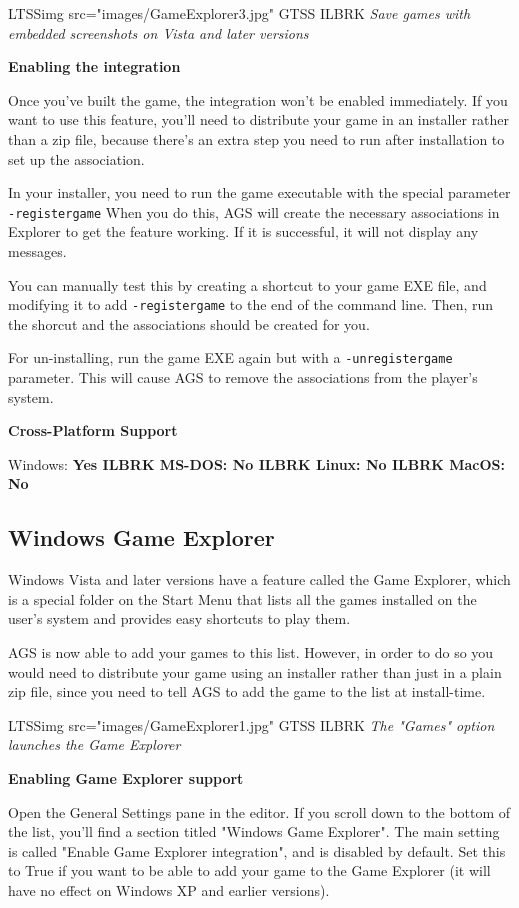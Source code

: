 LTSSimg src="images/GameExplorer3.jpg" GTSS ILBRK
\it{Save games with embedded screenshots on Vista and later versions}

\bf{Enabling the integration}

Once you've built the game, the integration won't be enabled immediately. If you want to
use this feature, you'll need to distribute your game in an installer rather than a zip
file, because there's an extra step you need to run after installation to set up the
association.

In your installer, you need to run the game executable with the special
parameter \verb$-registergame$  When you do this, AGS will create the necessary
associations in Explorer to get the feature working. If it is successful, it will
not display any messages.

You can manually test this by creating a shortcut to your game EXE file, and modifying
it to add \verb$-registergame$ to the end of the command line. Then, run the shorcut
and the associations should be created for you.

For un-installing, run the game EXE again but with a  \verb$-unregistergame$  parameter.
This will cause AGS to remove the associations from the player's system.

\bf{Cross-Platform Support}

Windows: \bf{ Yes }ILBRK
MS-DOS: \bf{ No }ILBRK
Linux: \bf{ No }ILBRK
MacOS: \bf{ No }


\subsection{Windows Game Explorer}\label{GameExplorer}%

Windows Vista and later versions have a feature called the Game Explorer, which is a special folder on
the Start Menu that lists all the games installed on the user's system and provides
easy shortcuts to play them.

AGS is now able to add your games to this list. However, in order to do so you
would need to distribute your game using an installer rather than just in a plain
zip file, since you need to tell AGS to add the game to the list at install-time.

LTSSimg src="images/GameExplorer1.jpg" GTSS ILBRK
\it{The "Games" option launches the Game Explorer}

\bf{Enabling Game Explorer support}

Open the General Settings pane in the editor. If you scroll down to the bottom of the
list, you'll find a section titled "Windows Game Explorer". The main setting
is called "Enable Game Explorer integration", and is disabled by default. Set this
to True if you want to be able to add your game to the Game Explorer (it will
have no effect on Windows XP and earlier versions).

